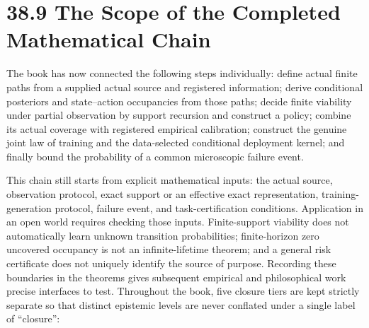 \documentclass[
  english,
  11pt,
  oneside]{book}
\begin{document}
\section{38.9 The Scope of the Completed Mathematical Chain}\label{the-scope-of-the-completed-mathematical-chain}

The book has now connected the following steps individually: define actual finite paths from a supplied actual source and registered information; derive conditional posteriors and state--action occupancies from those paths; decide finite viability under partial observation by support recursion and construct a policy; combine its actual coverage with registered empirical calibration; construct the genuine joint law of training and the data-selected conditional deployment kernel; and finally bound the probability of a common microscopic failure event.

This chain still starts from explicit mathematical inputs: the actual source, observation protocol, exact support or an effective exact representation, training-generation protocol, failure event, and task-certification conditions. Application in an open world requires checking those inputs. Finite-support viability does not automatically learn unknown transition probabilities; finite-horizon zero uncovered occupancy is not an infinite-lifetime theorem; and a general risk certificate does not uniquely identify the source of purpose. Recording these boundaries in the theorems gives subsequent empirical and philosophical work precise interfaces to test. Throughout the book, five closure tiers are kept strictly separate so that distinct epistemic levels are never conflated under a single label of ``closure'':
\end{document}

